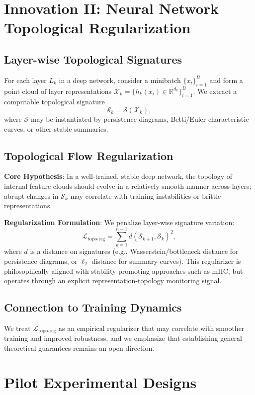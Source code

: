 \documentclass[10pt,leqno]{amsart}
\newcommand{\R}{\mathbb{R}}
\begin{document}
\section{Innovation II: Neural Network Topological Regularization}
\subsection{Layer-wise Topological Signatures}
For each layer $L_k$ in a deep network, consider a minibatch $\{x_i\}_{i=1}^{B}$ and form a point cloud of layer representations $\mathcal{X}_k=\{h_k(x_i)\in\R^{d_k}\}_{i=1}^{B}$. We extract a computable topological signature
\[
\mathcal{S}_k = \mathcal{S}(\mathcal{X}_k),
\]
where $\mathcal{S}$ may be instantiated by persistence diagrams, Betti/Euler characteristic curves, or other stable summaries.

\subsection{Topological Flow Regularization}
\textbf{Core Hypothesis}: In a well-trained, stable deep network, the topology of internal feature clouds should evolve in a relatively smooth manner across layers; abrupt changes in $\mathcal{S}_k$ may correlate with training instabilities or brittle representations.

\textbf{Regularization Formulation}: We penalize layer-wise signature variation:
\[
\mathcal{L}_{\text{topo-reg}} = \sum_{k=1}^{n-1} d\!\left(\mathcal{S}_{k+1},\mathcal{S}_{k}\right)^2,
\]
where $d$ is a distance on signatures (e.g., Wasserstein/bottleneck distance for persistence diagrams, or $\ell_2$ distance for summary curves). This regularizer is philosophically aligned with stability-promoting approaches such as mHC, but operates through an explicit representation-topology monitoring signal.

\subsection{Connection to Training Dynamics}
We treat $\mathcal{L}_{\text{topo-reg}}$ as an empirical regularizer that may correlate with smoother training and improved robustness, and we emphasize that establishing general theoretical guarantees remains an open direction.

\section{Pilot Experimental Designs}
\end{document}

